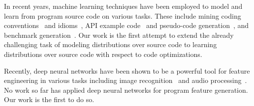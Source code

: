 In recent years, machine learning techniques have been employed to model and learn from program source code on various tasks. These include mining coding conventions~\cite{Allamanis2014a} and idioms~\cite{Allamanis2014}, API example code~\cite{Zhang2015a} and pseudo-code generation~\cite{Oda2015}, and benchmark generation~\cite{Cummins2017a}. Our work is the first attempt to extend the already challenging task of modeling distributions over source code to learning distributions over source code with respect to code optimizations.

Recently, deep neural networks have been shown to be a powerful tool for feature engineering in various tasks including image recognition~\cite{Krizhevsky2012,He2016} and audio processing~\cite{Lee2009b}. No work so far has applied deep neural networks for program feature generation. Our work is the first to do so.
